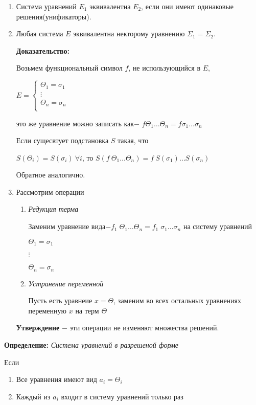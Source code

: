 \documentclass[12pt, a4paper]{article}
\begin{document}
		\begin{enumerate}
			\item Система уравнений $E_1$ эквивалентна $E_2$, если они имеют одинаковые решения(унификаторы).
			\item Любая система $E$ эквивалентна некторому уравнению $\Sigma_1=\Sigma_2$.
					
	\textbf{Доказательство:}\par
		Возьмем функциональный символ $f$, не использующийся в $E$, \par
		$		
		E=\begin{cases}			
			\Theta_1=\sigma_1&\\
			\vdots&\\
			\Theta_n=\sigma_n&\\
		\end{cases}
		$\par
		это же уравнение можно записать как$-$ $f \Theta_1 \hdots \Theta_n=f\sigma_1 \hdots\sigma_n$\par 
		Если сущесвтует подстановка $S$ такая, что\par $S(\Theta_i)=S(\sigma_i)\:\forall i$, 
		то $S(f\:\Theta_1 \hdots \Theta_n)=f\:S(\sigma_1) \hdots S(\sigma_n)$\par Обратное аналогично.
		\item Рассмотрим операции
		\begin{enumerate}
			\item \textit{Редукция терма} \par 
					Заменим уравнение вида$-f_1\;\Theta_1 \hdots\Theta_n=f_1\;\sigma_1\hdots\sigma_n$ на систему уравнений\par$\Theta_1=\sigma_1$\par$\vdots$\par$\Theta_n=\sigma_n$
			\item \textit{Устранение переменной} \par
			Пусть есть уравнеие $x=\Theta$, заменим во всех остальных уравнениях переменную $x$ на терм $\Theta$		
		\end{enumerate}
		\textbf{Утверждение} $-$ эти операции не изменяют множества решений.
	\end{enumerate}	
		\textbf{Определение:} \textit{Система уравнений в разрешеной форме}\par
		Если
			\begin{enumerate}
				\item Все уравнения имеют вид $a_i=\Theta_i$
				\item Каждый из $a_i$ входит в систему уравнений только раз
			\end{enumerate}
\end{document}
